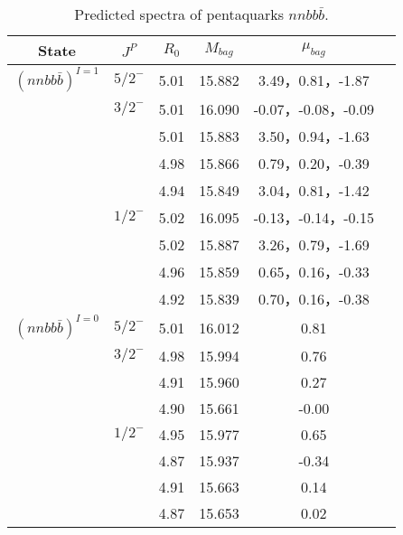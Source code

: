 \documentclass[prd,twocolumn,floatfix,nofootinbib]{revtex4}
\begin{document}
\renewcommand{\tabcolsep}{0.5cm}
\renewcommand{\arraystretch}{1.2}
\begin{table*}[!htbp]
    \caption{Predicted spectra of pentaquarks $nnbb\bar{b}$.}
    \begin{tabular}{cccccc}
        \hline\hline
        {\rm State} &$J^{P}$ &$R_{0}$ &$M_{bag}$ &$\mu_{bag}$  \\ \hline
        ${(nnbb\bar{b})}^{I=1}$
            &${5/2}^{-}$     &5.01   &15.882 &3.49，0.81，-1.87  \\                
            &${3/2}^{-}$     &5.01   &16.090 &-0.07，-0.08，-0.09 \\
                         &$ $     &5.01   &15.883 &3.50，0.94，-1.63  \\
                         &$ $     &4.98   &15.866 &0.79，0.20，-0.39  \\
                         &$ $     &4.94   &15.849 &3.04，0.81，-1.42 \\
            &${1/2}^{-}$     &5.02   &16.095 &-0.13，-0.14，-0.15  \\
                         &$ $     &5.02   &15.887 &3.26，0.79，-1.69  \\
                         &$ $     &4.96   &15.859 &0.65，0.16，-0.33  \\
                         &$ $     &4.92   &15.839 &0.70，0.16，-0.38 \\
            ${(nnbb\bar{b})}^{I=0}$
            &${5/2}^{-}$     &5.01   &16.012 &0.81  \\                
            &${3/2}^{-}$     &4.98   &15.994 &0.76 \\
                         &$ $     &4.91   &15.960 &0.27  \\
                         &$ $     &4.90   &15.661 &-0.00  \\
            &${1/2}^{-}$     &4.95   &15.977 &0.65  \\
                         &$ $     &4.87   &15.937 &-0.34  \\
                         &$ $     &4.91   &15.663 &0.14  \\
                         &$ $     &4.87   &15.653 &0.02 \\
       \hline\hline
    \end{tabular}
\end{table*}
\end{document}
